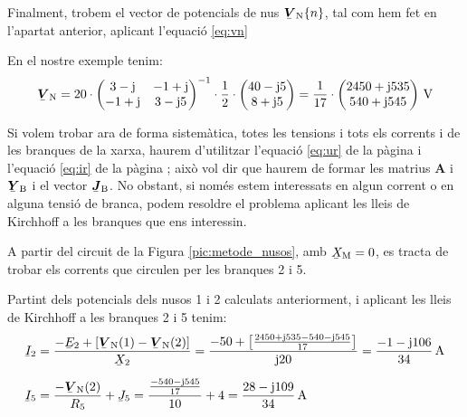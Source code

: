 Finalment,
trobem el vector de potencials de nus $\mcmplx{V}\ped{N}\{n\}$, tal
com  hem fet en l'apartat anterior, aplicant l'equaci\'{o} \eqref{eq:vn}

En el nostre exemple tenim:
\[
   \mcmplx{V}\ped{N} =
   20 \cdot \begin{pmatrix}
         3 - \ju  & -1 + \ju \\ -1 + \ju & 3 - \ju 5
   \end{pmatrix} ^{-1} \cdot
   \frac{1}{2} \cdot \begin{pmatrix}
         40 - \ju 5 \\
         8 + \ju 5
   \end{pmatrix} =
   \frac{1}{17} \cdot \begin{pmatrix}
         2450 + \ju 535 \\ 540  + \ju 545
   \end{pmatrix}\unit{V}
\]

Si volem trobar ara de forma sistem\`{a}tica, totes les tensions i tots els corrents i  de les branques de la xarxa, haurem d'utilitzar l'equaci\'{o} \eqref{eq:ur} de la p\`{a}gina \pageref{eq:ur} i
l'equaci\'{o} \eqref{eq:ir} de la p\`{a}gina \pageref{eq:ir}; aix\`{o} vol dir que haurem de formar les matrius $\boldsymbol{A}$ i $\mcmplx{Y}\ped{B}$ i el vector $\mcmplx{J}\ped{B}$. No obstant, si nom\'{e}s estem interessats en algun corrent o en alguna tensi\'{o} de branca, podem resoldre el problema aplicant les lleis de Kirchhoff a les branques que ens interessin.

\begin{exemple}
A partir del circuit de la Figura \vref{pic:metode_nusos}, amb
$\cmplx{X}\ped{M}=0$, es tracta de trobar els corrents que circulen
per les branques 2 i 5.

Partint dels potencials dels nusos 1 i 2 calculats anteriorment, i
aplicant les lleis de Kirchhoff a les branques 2 i 5 tenim:
\begin{align*}
   \cmplx{I}_2 &= \frac{-\cmplx{E}_2 + [\mcmplx{V}\ped{N}(1) - \mcmplx{V}\ped{N}(2)]}
                  {\cmplx{X}_2} = \frac{-50 + \left[\frac{2450+\ju 535 -540
                  - \ju 545}{17}\right]} {\ju 20} = \frac{-1 - \ju 106}{34}\unit{A} \\[1.5ex]
   \cmplx{I}_5 &=  \frac{- \mcmplx{V}\ped{N}(2)}{R_5}  + \cmplx{J}_5 =
                  \frac{\frac{-540 - \ju 545}{17}}{10} + 4 =
                  \frac{28 - \ju 109}{34}\unit{A}
\end{align*}

\end{exemple}

